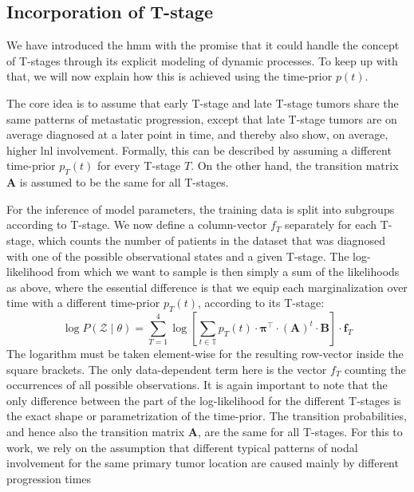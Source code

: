 \documentclass[../ms.tex]{subfiles}
\begin{document}
\subsection{Incorporation of T-stage}
\label{subsec:hmm_tstage}

We have introduced the \gls{hmm} with the promise that it could handle the concept of T-stages through its explicit modeling of dynamic processes. To keep up with that, we will now explain how this is achieved using the time-prior $p(t)$.

The core idea is to assume that early T-stage and late T-stage tumors share the same patterns of metastatic progression, except that late T-stage tumors are on average diagnosed at a later point in time, and thereby also show, on average, higher \gls{lnl} involvement. Formally, this can be described by assuming a different time-prior $p_T (t)$ for every T-stage $T$.  On the other hand, the transition matrix $\mathbf{A}$ is assumed to be the same for all T-stages.

For the inference of model parameters, the training data is split into subgroups according to T-stage. We now define a column-vector $f_T$ separately for each T-stage, which counts the number of patients in the dataset that was diagnosed with one of the possible observational states and a given T-stage. The log-likelihood from which we want to sample is then simply a sum of the likelihoods as above, where the essential difference is that we equip each marginalization over time with a different time-prior $p_T (t)$, according to its T-stage:
%
\begin{equation} \label{eq:hmm_log_likelihood}
    \log{P \left( \boldsymbol{\mathcal{Z}} \mid \theta \right)} = \sum_{T=1}^{4}{\log{\left[ \sum_{t \in \mathbb{T}}{p_T (t) \cdot \boldsymbol{\pi}^\top \cdot (\mathbf{A})^t \cdot \mathbf{B}} \right]} \cdot \mathbf{f}_T}
\end{equation}
%
The logarithm must be taken element-wise for the resulting row-vector inside the square brackets. The only data-dependent term here is the vector $f_T$ counting the occurrences of all possible observations. It is again important to note that the only difference between the part of the log-likelihood for the different T-stages is the exact shape or parametrization of the time-prior. The transition probabilities, and hence also the transition matrix $\mathbf{A}$, are the same for all T-stages. For this to work, we rely on the assumption that different typical patterns of nodal involvement for the same primary tumor location are caused mainly by different progression times
\end{document}
